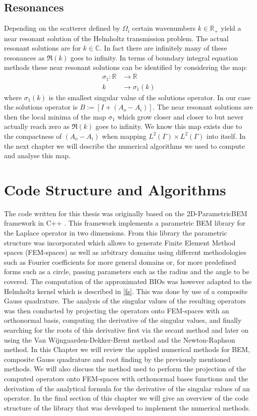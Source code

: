 \documentclass[a4paper, oneside]{thirdparty_stylesheets/discothesis}
\begin{document}
\section{Resonances}
Depending on the scatterer defined by $\Omega_i$ certain wavenumbers $k \in \mathbb{R}_+$ yield a near resonant solution of the Helmholtz transmission problem.
The actual resonant solutions are for $k \in \mathbb{C}$.
In fact there are infinitely many of these resonances as $\Re(k)$ goes to infinity. 
In terms of boundary integral equation methods these near resonant solutions can be identified by considering the map:
\begin{align}
	\sigma_1: \mathbb{R}&\longrightarrow\mathbb{R} \\
	k&\longrightarrow\sigma_1(k)
\end{align}
where $\sigma_1(k)$ is the smallest singular value of the solutions operator.
In our case the solutions operator is $B := [I +(A_o-A_i)]$.
The near resonant solutions are then the local minima of the map $\sigma_1$ which grow closer and closer to but never actually reach zero as $\Re(k)$ goes to infinity.
We know this map exists due to the compactness of $(A_o-A_i)$ when mapping $L^2(\Gamma)\times L^2(\Gamma)$ into itself.
In the next chapter we will describe the numerical algorithms we used to compute and analyse this map.

\chapter{Code Structure and Algorithms} \label{code}
The code written for this thesis was originally based on the 2D-ParametricBEM framework in C++ \cite{test}. 
This framework implements a parametric BEM library for the Laplace operator in two dimensions.
From this library the parametric structure was incorporated which allows to generate Finite Element Method spaces (FEM-spaces) as well as arbitrary domains using different methodologies such as Fourier coefficients for more general domains or, for more predefined forms such as a circle, passing parameters such as the radius and the angle to be covered.
The computation of the approximated BIOs was however adapted to the Helmholtz kernel which is described in \ref{fs}.
This was done by use of a composite Gauss quadrature.
The analysis of the singular values of the resulting operators was then conducted by projecting the operators onto FEM-spaces with an orthonormal basis, computing the derivative of the singular values, and finally searching for the roots of this derivative first via the secant method and later on using the Van Wijngaarden-Dekker-Brent method and the Newton-Raphson method.
In this Chapter we will review the applied numerical methods for BEM, composite Gauss quadrature and root finding by the previously mentioned methods.
We will also discuss the method used to perform the projection of the computed operators onto FEM-spaces with orthonormal bases functions and the derivation of the analytical formula for the derivative of the singular values of an operator.
In the final section of this chapter we will give an overview of the code structure of the library that was developed to implement the numerical methods.
\end{document}
